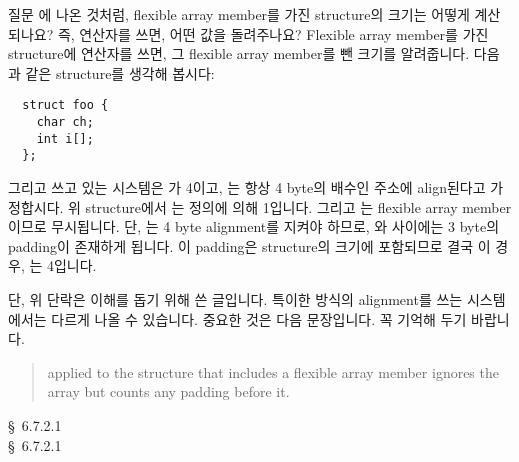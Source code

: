 \begin{faq}
	질문 에 나온 것처럼, flexible array member를 가진 structure의
        크기는 어떻게 계산되나요? 즉,  연산자를 쓰면, 어떤 값을
        돌려주나요?
\A
        Flexible array member를 가진 structure에  연산자를
        쓰면, 그 flexible array member를 뺀 크기를 알려줍니다. 다음과 같은
        structure를 생각해 봅시다:
\begin{verbatim}
  struct foo {
    char ch;
    int i[];
  };
\end{verbatim}
	그리고 쓰고 있는 시스템은 가 4이고, 는 항상
        4 byte의 배수인 주소에 align된다고 가정합시다. 위
        structure에서 는 정의에 의해 1입니다.
        그리고 는 flexible array member이므로 무시됩니다. 단,
        는 4 byte alignment를 지켜야 하므로, 와  사이에는
        3 byte의 padding이 존재하게 됩니다.
        이 padding은 structure의 크기에 포함되므로 결국 이 경우, 
        는 4입니다.

        단, 위 단락은 이해를 돕기 위해 쓴 글입니다. 특이한 방식의
        alignment를 쓰는 시스템에서는 다르게 나올 수 있습니다. 중요한 것은
        다음 문장입니다. 꼭 기억해 두기 바랍니다.

        \begin{quote}
           applied to the structure that includes a flexible
          array member ignores the array but counts any padding before it.
        \end{quote}
\R
	\cite{c99} \S\ 6.7.2.1 \\
        \cite{rational2} \S\ 6.7.2.1
\end{faq}

